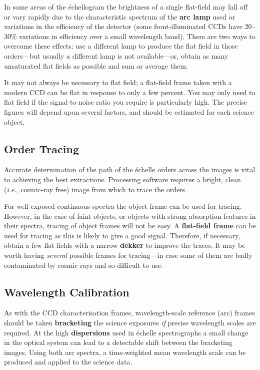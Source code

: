 \documentclass[twoside,11pt]{article}
\newcommand{\htmlref}[2]{#1}
\newcommand{\sgspec}[2]{#1}
\newcommand{\sgspec}[2]{#2}
\begin{document}
In some areas of the \'{e}chellogram the brightness of a single
flat-field may fall off or vary rapidly due to the characteristic
spectrum of the \htmlref{{\bf arc lamp}}{gl_arc}
used or variations in the efficiency of the
detector (some front-illuminated CCDs have 20\sgspec{--}{-}30\%
variations in efficiency over a small wavelength band).
There are two ways to overcome these effects: use a different lamp
to produce the flat field in those orders\sgspec{---}{ - }but usually a
different lamp is not available\sgspec{---}{ - }or, obtain as many
unsaturated flat fields as possible and sum or average them.

It may not always be necessary to flat field; a flat-field frame
taken with a modern CCD can be flat in response to only a few percent.
You may only need to flat field if the signal-to-noise ratio you
require is particularly high.  The precise figures will depend upon
several factors, and should be estimated for each science object.


\subsection{Order Tracing}

Accurate determination of the path of the \'{e}chelle orders across the
images is vital to achieving the best extractions.  Processing software
requires a bright, clean ({\em{i.e.}}, cosmic-ray free) image from which
to trace the orders.

For well-exposed continuous spectra the object frame can be used for
tracing.  However, in the case of faint objects, or
objects with strong absorption features in their spectra, tracing of
object frames will not be easy.
A \htmlref{{\bf flat-field frame}}{gl_flat_field} can be used for tracing as
this is likely to give a good signal.
Therefore, if necessary, obtain a few flat fields with a narrow
\htmlref{{\bf dekker}}{gl_dekker} to improve the traces.
It may be worth having {\em several} possible frames for
tracing\sgspec{---}{ - }in case some of them are badly contaminated
by cosmic rays and so difficult to use.


\subsection{Wavelength Calibration}

As with the CCD characterisation frames, wavelength-scale reference
(arc) frames should be taken \htmlref{{\bf bracketing}}{gl_bracketing} the
science exposures {\em if} precise wavelength scales are required.
At the high \htmlref{{\bf dispersions}}{gl_dispersion}
used in \'{e}chelle spectrographs a small
change in the optical system can lead to a detectable shift between the
bracketing images.
Using both arc spectra, a time-weighted mean wavelength scale can be
produced and applied to the science data.
\end{document}
